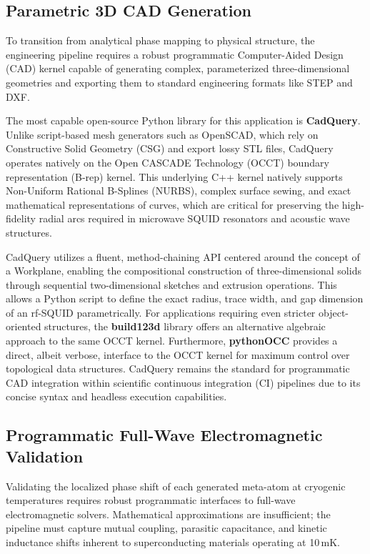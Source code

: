\documentclass[11pt, a4paper]{article}
\begin{document}
\subsection{Parametric 3D CAD Generation}

To transition from analytical phase mapping to physical structure, the engineering pipeline requires a robust programmatic Computer-Aided Design (CAD) kernel capable of generating complex, parameterized three-dimensional geometries and exporting them to standard engineering formats like STEP and DXF.

The most capable open-source Python library for this application is \textbf{CadQuery}. Unlike script-based mesh generators such as OpenSCAD, which rely on Constructive Solid Geometry (CSG) and export lossy STL files, CadQuery operates natively on the Open CASCADE Technology (OCCT) boundary representation (B-rep) kernel. This underlying C++ kernel natively supports Non-Uniform Rational B-Splines (NURBS), complex surface sewing, and exact mathematical representations of curves, which are critical for preserving the high-fidelity radial arcs required in microwave SQUID resonators and acoustic wave structures.

CadQuery utilizes a fluent, method-chaining API centered around the concept of a Workplane, enabling the compositional construction of three-dimensional solids through sequential two-dimensional sketches and extrusion operations. This allows a Python script to define the exact radius, trace width, and gap dimension of an rf-SQUID parametrically. For applications requiring even stricter object-oriented structures, the \textbf{build123d} library offers an alternative algebraic approach to the same OCCT kernel. Furthermore, \textbf{pythonOCC} provides a direct, albeit verbose, interface to the OCCT kernel for maximum control over topological data structures. CadQuery remains the standard for programmatic CAD integration within scientific continuous integration (CI) pipelines due to its concise syntax and headless execution capabilities.

\subsection{Programmatic Full-Wave Electromagnetic Validation}

Validating the localized phase shift of each generated meta-atom at cryogenic temperatures requires robust programmatic interfaces to full-wave electromagnetic solvers. Mathematical approximations are insufficient; the pipeline must capture mutual coupling, parasitic capacitance, and kinetic inductance shifts inherent to superconducting materials operating at 10\,mK.
\end{document}
